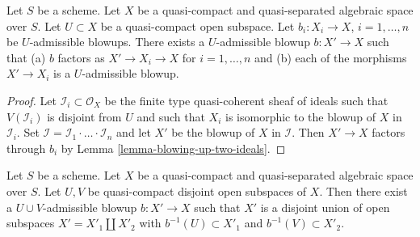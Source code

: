\begin{lemma}
\label{lemma-dominate-admissible-blowups}
Let $S$ be a scheme.
Let $X$ be a quasi-compact and quasi-separated algebraic space over $S$.
Let $U \subset X$ be a quasi-compact open subspace.
Let $b_i : X_i \to X$, $i = 1, \ldots, n$ be $U$-admissible blowups.
There exists a $U$-admissible blowup $b : X' \to X$ such that
(a) $b$ factors as $X' \to X_i \to X$ for $i = 1, \ldots, n$ and
(b) each of the morphisms $X' \to X_i$ is a $U$-admissible blowup.
\end{lemma}

\begin{proof}
Let $\mathcal{I}_i \subset \mathcal{O}_X$ be the finite type
quasi-coherent sheaf of ideals such that $V(\mathcal{I}_i)$ is
disjoint from $U$ and such that $X_i$ is isomorphic to the
blowup of $X$ in $\mathcal{I}_i$. Set
$\mathcal{I} = \mathcal{I}_1 \cdot \ldots \cdot \mathcal{I}_n$
and let $X'$ be the blowup of $X$ in $\mathcal{I}$. Then
$X' \to X$ factors through $b_i$ by Lemma \ref{lemma-blowing-up-two-ideals}.
\end{proof}

\begin{lemma}
\label{lemma-separate-disjoint-opens-by-blowing-up}
Let $S$ be a scheme.
Let $X$ be a quasi-compact and quasi-separated algebraic space over $S$.
Let $U, V$ be quasi-compact disjoint open subspaces of $X$.
Then there exist a $U \cup V$-admissible blowup $b : X' \to X$
such that $X'$ is a disjoint union of open subspaces
$X' = X'_1 \amalg X'_2$ with $b^{-1}(U) \subset X'_1$ and
$b^{-1}(V) \subset X'_2$.
\end{lemma}

